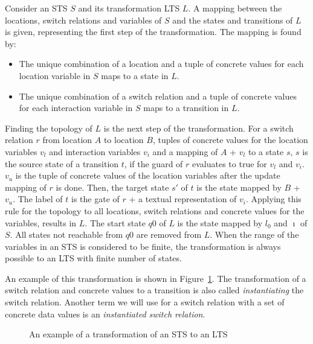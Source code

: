Consider an STS $S$ and its transformation LTS $L$. A mapping between the locations, switch relations and variables of $S$ and the states and transitions of $L$ is given, representing the first step of the transformation. The mapping is found by:
\begin{itemize}
  \item The unique combination of a location and a tuple of concrete values for each location variable in $S$ maps to a state in $L$. 
  \item The unique combination of a switch relation and a tuple of concrete values for each interaction variable in $S$ maps to a transition in $L$.
\end{itemize}
Finding the topology of $L$ is the next step of the transformation. For a switch relation $r$ from location $A$ to location $B$, tuples of concrete values for the location variables $v_l$ and interaction variables $v_i$ and a mapping of $A$ + $v_l$ to a state $s$, $s$ is the source state of a transition $t$, if the guard of $r$ evaluates to true for $v_l$ and $v_i$. $v_u$ is the tuple of concrete values of the location variables after the update mapping of $r$ is done. Then, the target state $s'$ of $t$ is the state mapped by $B$ + $v_u$. The label of $t$ is the gate of $r$ + a textual representation of $v_i$. Applying this rule for the topology to all locations, switch relations and concrete values for the variables, results in $L$. The start state $q0$ of $L$ is the state mapped by $l_0$ and $\imath$ of $S$. All states not reachable from $q0$ are removed from $L$. When the range of the variables in an STS is considered to be finite, the transformation is always possible to an LTS with finite number of states.

An example of this transformation is shown in Figure~\ref{fig:example_trafo}. The transformation of a switch relation and concrete values to a transition is also called \textit{instantiating} the switch relation. Another term we will use for a switch relation with a set of concrete data values is an \textit{instantiated switch relation}.

\begin{figure}[h]
  \begin{center}
    \hspace{20px}
  \end{center}
  \caption{An example of a transformation of an STS to an LTS}
  \label{fig:example_trafo}
\end{figure}

